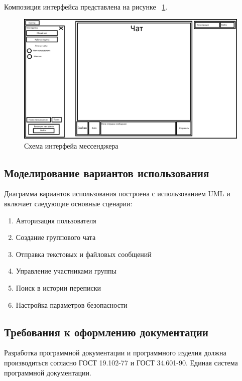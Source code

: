 Композиция интерфейса представлена на рисунке ~\ref{fig:ui-}.

\begin{figure}
	\centering
	\includegraphics[width=1.0\linewidth]{"images/UI макет"}
	\caption{Схема интерфейа мессенджера}
	\label{fig:ui-}
\end{figure}


\subsection{Моделирование вариантов использования}

Диаграмма вариантов использования построена с использованием UML и включает следующие основные сценарии:
\begin{enumerate}
	\item Авторизация пользователя
	\item Создание группового чата
	\item Отправка текстовых и файловых сообщений
	\item Управление участниками группы
	\item Поиск в истории переписки
	\item Настройка параметров безопасности
\end{enumerate}

\subsection{Требования к оформлению документации}

Разработка программной документации и программного изделия должна производиться согласно ГОСТ 19.102-77 и ГОСТ 34.601-90. Единая система программной документации.